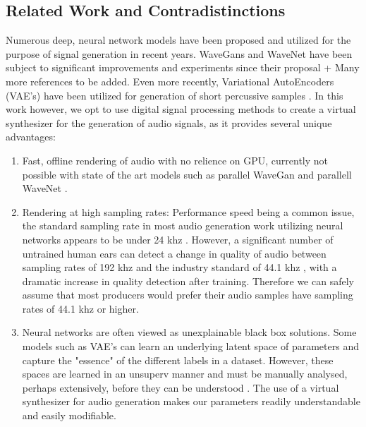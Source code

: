 \documentclass{nime-alternate} %
\begin{document}
\subsection{Related Work and Contradistinctions}
\label{related}
Numerous deep, neural network models have been proposed and utilized for the purpose of signal generation in recent years. WaveGans and WaveNet have been subject to significant improvements and experiments since their proposal \colorbox{green!=40}{\cite{nsynth2017} + Many more references to be added.} Even more recently, Variational AutoEncoders (VAE's) have been utilized for generation of short percussive samples \cite{aouameur2019neural,ramires2019timbfeat}. In this work however, we opt to use digital signal processing methods to create a virtual synthesizer for the generation of audio signals, as it provides several unique advantages:
\begin{enumerate}[label=\roman*]
  \item Fast, offline rendering of audio with no relience on GPU, currently not possible with state of the art models such as parallel WaveGan \cite{yamamoto2019parallel} and parallell WaveNet \cite{oord2017parallel}. 
  \item Rendering at high sampling rates: Performance speed being a common issue, the standard sampling rate in most audio generation work utilizing neural networks appears to be under 24 khz \cite{yamamoto2019parallel,oord2017parallel,aouameur2019neural,ramires2019timbfeat}. However, a significant number of untrained human ears can detect a change in quality of audio between sampling rates of 192 khz and the industry standard of 44.1 khz \cite{reiss2016meta}, with a dramatic increase in quality detection after training. Therefore we can safely assume that most producers would prefer their audio samples have sampling rates of 44.1 khz or higher. 
  \item Neural networks are often viewed as unexplainable black box solutions. Some models such as VAE's can learn an underlying latent space of parameters and capture the "essence" of the different labels in a dataset. However, these spaces are learned in an unsuperv manner and must be manually analysed, perhaps extensively, before they can be understood \cite{esling2018generative}. The use of a virtual synthesizer for audio generation makes our parameters readily understandable and easily modifiable. \\
  
\end{enumerate}
\end{document}
